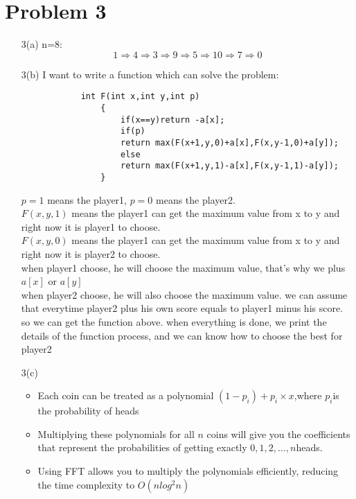 \documentclass[12pt,letterpaper]{article}
\begin{document}
\section{Problem 3}
    \begin{itemize}
        \item [3(a)]
            n=8:
                \[1\Rightarrow 4\Rightarrow 3\Rightarrow 9\Rightarrow 5\Rightarrow 10\Rightarrow 7\Rightarrow 0 \]
        \item [3(b)]
            I want to write a function which can solve the problem:
            \begin{verbatim}
            int F(int x,int y,int p)
                {
                    if(x==y)return -a[x];
                    if(p)
                    return max(F(x+1,y,0)+a[x],F(x,y-1,0)+a[y]);
                    else
                    return max(F(x+1,y,1)-a[x],F(x,y-1,1)-a[y]);
                }
            \end{verbatim}
            $p=1$ means the player1, $p=0$ means the player2.\\
            $F(x,y,1)$ means the player1 can get the maximum value from x to y and right now it is player1 to choose.\\
            $F(x,y,0)$ means the player1 can get the maximum value from x to y and right now it is player2 to choose.\\
            when player1 choose, he will choose the maximum value, that's why we plus $a[x]$ or $a[y]$\\
            when player2 choose, he will  also choose the maximum value. we can assume that everytime player2 plus his own score equals to player1 minus his score.\\
            so we can get the function above.
            when everything is done, we print the details of the function process, and we can know how to choose the best for player2        
        \item [3(c)]
            \begin{itemize}
                \item Each coin can be treated as a polynomial $(1-p_i)+p_i\times x$,where $p_i$is the probability of heads
                \item Multiplying these polynomials for all $n$ coins will give you the coefficients that represent the probabilities of getting exactly $0,1,2,\dots,n$heads.
                \item Using FFT allows you to multiply the polynomials efficiently, reducing the time complexity to $O(nlog^2n)$
            \end{itemize}
    \end{itemize}
\end{document}
